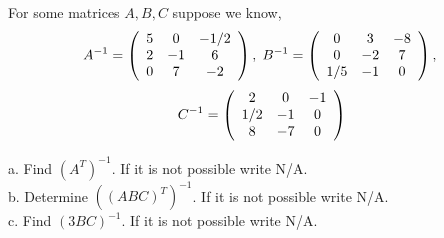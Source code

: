 \documentclass{ximera}
\author{Parisa Fatheddin}
\begin{document}
\begin{exercise}
For some matrices $A, B, C$ suppose we know,
\[ A^{-1} = \left(\begin{array}{ccc}
5 & 0 & -1/2 \\
2 &-1 & 6\\
0 & 7 & -2 
\end{array}\right), \hspace{.1cm} B^{-1} = 
\left(\begin{array}{ccc}
0 & 3 & -8 \\
0 &-2 & 7\\
1/5 & -1 & 0
\end{array}\right), \]
\[\hspace{.1cm} C^{-1} =
\left(\begin{array}{ccc}
2 & 0 & -1 \\
1/2 &-1 & 0\\
8 & -7 & 0
\end{array}\right)
\]

a. Find $\left(A^{T}\right)^{-1}$. If it is not possible write N/A. \\
b. Determine $\left((ABC)^{T}\right)^{-1}$. If it is not possible write N/A.\\
c. Find $\left(3BC\right)^{-1}$. If it is not possible write N/A. 
\end{exercise} 
\end{document}
